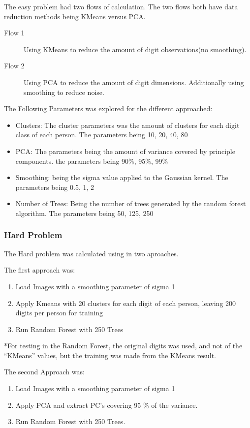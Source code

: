\documentclass[report]{subfiles}
\begin{document}
The easy problem had two flows of calculation. The two flows both have data reduction methods being KMeans versus PCA.

\begin{description}
\item[Flow 1] Using KMeans to reduce the amount of digit observations(no smoothing).
\item[Flow 2] Using PCA to reduce the amount of digit dimensions. Additionally using smoothing to reduce noise.
\end{description}

The Following Parameters was explored for the different approached:
\begin{itemize}
\item Clusters: The cluster parameters was the amount of clusters for each digit class of each person. The parameters being {10, 20, 40, 80}
\item PCA: The parameters being the amount of variance covered by principle components. the parameters being {90\%, 95\%, 99\%}
\item Smoothing: being the sigma value applied to the Gaussian kernel. The parameters being {0.5, 1, 2}
\item Number of Trees: Being the number of trees generated by the random forest algorithm. The parameters being {50, 125, 250}
\end{itemize}

\subsubsection{Hard Problem}
\label{sec:implRF:hardProblem}
The Hard problem was calculated using in two aproaches.

The first approach was:
\begin{enumerate}
\item Load Images with a smoothing parameter of sigma 1
\item Apply Kmeans with 20 clusters for each digit of each person, leaving 200 digits per person for training
\item Run Random Forest with 250 Trees
\end{enumerate}

*For testing in the Random Forest, the original digits was used, and not of the ``KMeans'' values, but the training was made from the KMeans result.  

The second Approach was:
\begin{enumerate}
\item Load Images with a smoothing parameter of sigma 1
\item Apply PCA and extract PC's covering 95 \% of the variance. 
\item Run Random Forest with 250 Trees.
\end{enumerate}
\end{document}
